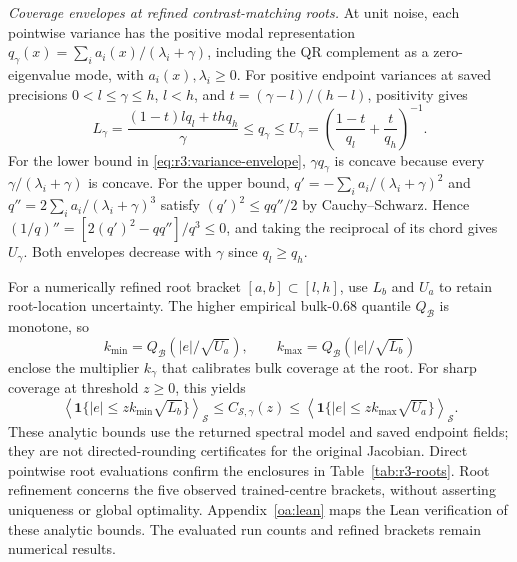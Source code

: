 \emph{Coverage envelopes at refined contrast-matching roots.}\label{app:r3:root-envelope}
At unit noise, each pointwise variance has the positive modal representation
$q_\gamma(x)=\sum_i a_i(x)/(\lambda_i+\gamma)$, including the QR complement
as a zero-eigenvalue mode, with $a_i(x),\lambda_i\ge0$.
For positive endpoint variances at saved precisions
$0<l\le\gamma\le h$, $l<h$, and
$t=(\gamma-l)/(h-l)$, positivity gives
\begin{equation}\label{eq:r3:variance-envelope}
 L_\gamma=\frac{(1-t)lq_l+thq_h}{\gamma}
 \le q_\gamma\le
 U_\gamma=\left(\frac{1-t}{q_l}+\frac{t}{q_h}\right)^{-1}.
\end{equation}
For the lower bound in \eqref{eq:r3:variance-envelope}, $\gamma q_\gamma$ is concave because every
$\gamma/(\lambda_i+\gamma)$ is concave. For the upper bound,
$q'=-\sum_i a_i/(\lambda_i+\gamma)^2$ and
$q''=2\sum_i a_i/(\lambda_i+\gamma)^3$ satisfy
$(q')^2\le qq''/2$ by Cauchy--Schwarz. Hence
$(1/q)''=[2(q')^2-qq'']/q^3\le0$, and taking the reciprocal of its chord gives
$U_\gamma$. Both envelopes decrease with $\gamma$ since $q_l\ge q_h$.

For a numerically refined root bracket $[a,b]\subset[l,h]$, use $L_b$ and
$U_a$ to retain root-location uncertainty. The higher empirical bulk-$0.68$
quantile $Q_{\mathcal B}$ is monotone, so
\[
 k_{\min}=Q_{\mathcal B}(|e|/\sqrt{U_a}),\qquad
 k_{\max}=Q_{\mathcal B}(|e|/\sqrt{L_b})
\]
enclose the multiplier $k_\gamma$ that calibrates bulk coverage at the root.
For sharp coverage at threshold $z\ge0$, this yields
\begin{equation}\label{eq:r3:coverage-envelope}
 \left\langle\mathbf1\{|e|\le z k_{\min}\sqrt{L_b}\}\right\rangle_{\mathcal S}
 \le C_{\mathcal S,\gamma}(z)\le
 \left\langle\mathbf1\{|e|\le z k_{\max}\sqrt{U_a}\}\right\rangle_{\mathcal S}.
\end{equation}
These analytic bounds use the returned spectral model and saved endpoint fields;
they are not directed-rounding certificates for the original Jacobian.
Direct pointwise root evaluations confirm the enclosures in Table~\ref{tab:r3-roots}.
Root refinement concerns the five observed
trained-centre brackets, without asserting uniqueness or global optimality.
Appendix~\ref{oa:lean} maps the Lean verification of these analytic bounds.
The evaluated run counts and refined brackets remain numerical results.


